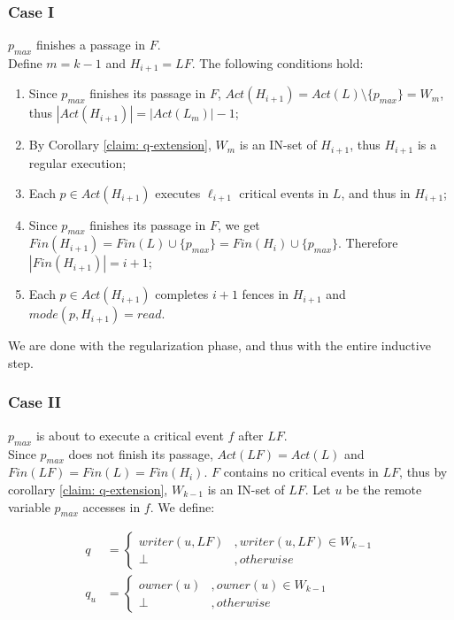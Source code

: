 \subsubsection*{\hspace{5mm} Case I}
$p_{max}$ finishes a passage in $F$.
\\ Define $m = k-1$ and $H_{i+1} = L F$. The following conditions hold:
\begin{enumerate}
	\item Since $p_{max}$ finishes its passage in $F$, $Act(H_{i+1}) = Act(L) \setminus \{p_{max}\} = W_m$, thus $|Act(H_{i+1})| = |Act(L_m)|-1$;
	\item By Corollary \ref{claim: q-extension}, $W_m$ is an IN-set of $H_{i+1}$, thus $H_{i+1}$ is a regular execution;
	\item Each $p \in Act(H_{i+1})$ executes $\ell_{i+1}$ critical events in $L$, and thus in $H_{i+1}$;
	\item Since $p_{max}$ finishes its passage in $F$, we get $Fin(H_{i+1}) = Fin(L) \cup \{p_{max}\} = Fin(H_i) \cup \{p_{max}\}$. Therefore $|Fin(H_{i+1})| = i+1$;
	\item Each $p \in Act(H_{i+1})$ completes $i+1$ fences in $H_{i+1}$ and $mode(p,H_{i+1}) = read$.
\end{enumerate}
We are done with the regularization phase, and thus with the entire inductive step.

\subsubsection*{\hspace{5mm} Case II}
$p_{max}$ is about to execute a critical event $f$ after $L F$.
\\ Since $p_{max}$ does not finish its passage, $Act(L F) = Act(L)$ and $Fin(L F) = Fin(L) = Fin(H_i)$. $F$ contains no critical events in $L F$, thus by corollary \ref{claim: q-extension}, $W_{k-1}$ is an IN-set of $L F$. Let $u$ be the remote variable $p_{max}$ accesses in $f$. We define:

\begin{align*}
q & = \begin{cases}
	writer(u, L F) & ,writer(u, L F) \in W_{k-1}
	\\ \perp & ,otherwise
	\end{cases}
\\
q_u & = \begin{cases}
	owner(u) & ,owner(u) \in W_{k-1}
	\\ \perp & ,otherwise
	\end{cases}
\end{align*}

